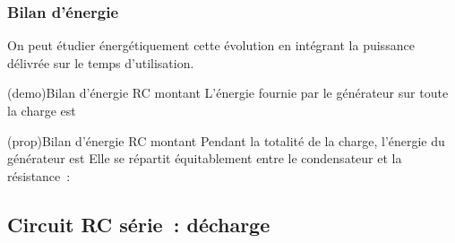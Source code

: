 \documentclass[../../main/main.tex]{subfiles}
\begin{document}
\subsubsection{Bilan d'énergie}
On peut étudier énergétiquement cette évolution en intégrant la puissance
délivrée sur le temps d'utilisation.
\begin{tcb*}[label=demo:rcenerg-charge, breakable]
	(demo){Bilan d'énergie RC montant}
	L'énergie fournie par le générateur sur toute la charge est
	\vspace{-15pt}
\end{tcb*}
\begin{tcb*}[label=prop:rcenerg-charge, sidebyside]
	(prop){Bilan d'énergie RC montant}
	Pendant la totalité de la charge, l'énergie du générateur est
	\psw{%
		\[\boxed{\Ec_G = CE^2}\]
	}%
	\vspace{-15pt}
	\tcblower
	Elle se répartit équitablement entre le condensateur et la résistance~:
	\psw{%
		\[\boxed{\Ec_C = \frac{1}{2} CE^2 = \Ec_J}\]
	}%
	\vspace{-15pt}
\end{tcb*}

\subsection{Circuit RC série~: décharge}
\end{document}
